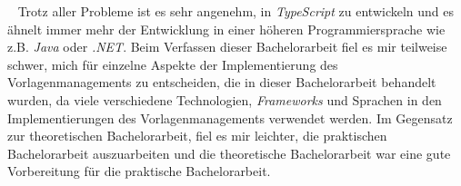 \ \newline
Trotz aller Probleme ist es sehr angenehm, in \emph{TypeScript} zu entwickeln und es ähnelt immer mehr der Entwicklung in einer höheren Programmiersprache wie z.B. \emph{Java} oder \emph{.NET}.
\newline
\newline
Beim Verfassen dieser Bachelorarbeit fiel es mir teilweise schwer, mich für einzelne Aspekte der Implementierung des Vorlagenmanagements zu entscheiden, die in dieser Bachelorarbeit behandelt wurden, da viele verschiedene Technologien, \emph{Frameworks} und Sprachen in den Implementierungen des Vorlagenmanagements verwendet werden. Im Gegensatz zur theoretischen Bachelorarbeit, fiel es mir leichter, die praktischen Bachelorarbeit auszuarbeiten und die theoretische Bachelorarbeit war eine gute Vorbereitung für die praktische Bachelorarbeit.